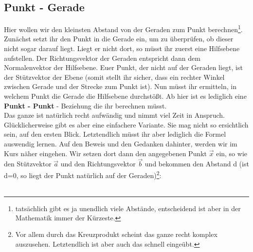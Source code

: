 \subsection{Punkt - Gerade}
	Hier wollen wir den kleinsten Abstand von der Geraden zum Punkt
	berechnen\footnote{tatsächlich gibt es ja unendlich viele Abstände,
	entscheidend ist aber in der Mathematik immer der Kürzeste.}.\\
	Zunächst setzt ihr den Punkt in die Gerade ein, um zu überprüfen, ob dieser
	nicht sogar darauf liegt. Liegt er nicht dort, so müsst ihr zuerst eine
	Hilfsebene aufstellen. Der Richtungsvektor der Geraden entspricht dann dem
	Normalenvektor der Hilfsebene. Euer Punkt, der nicht auf der Geraden liegt, ist
	der Stützvektor der Ebene (somit stellt ihr sicher, dass ein rechter Winkel
	zwischen Gerade und der Strecke zum Punkt ist). Nun müsst ihr ermitteln, in
	welchem Punkt die Gerade die Hilfsebene durchstößt. Ab hier ist es lediglich
	eine \textbf{Punkt - Punkt} - Beziehung die ihr berechnen müsst.\\
	Das ganze ist natürlich recht aufwändig und nimmt viel Zeit in Anspruch.
	Glücklicherweise gibt es aber eine einfachere Variante. Sie mag nicht so
	ersichtlich sein, auf den ersten Blick. Letztendlich müsst ihr aber lediglich
	die Formel auswendig lernen. Auf den Beweis und den Gedanken dahinter, werden
	wir im Kurs näher eingehen. Wir setzen dort dann den angegebenen Punkt
	\(\vec{x}\) ein, so wie den Stützvektor \(\vec{a}\) und den Richtungsvektor
	\(\vec{b}\) und bekommen den Abstand d (ist d=0, so liegt der Punkt natürlich
	auf der Geraden)\footnote{Vor allem durch das Kreuzprodukt scheint das ganze
	recht komplex auszusehen. Letztendlich ist aber auch das schnell eingeübt.}:
	\\ \\
	\formel{\[d=\frac{|(\vec{a}-\vec{x})\times \vec{b}|}{|\vec{b}|}\]}
	
